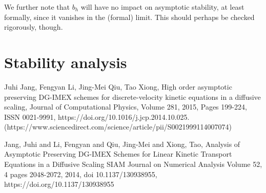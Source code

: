 \documentclass[]{article}
\begin{document}
We further note that $b_h$ will have no impact on asymptotic stability, at least formally, since it vanishes in the (formal) limit. This should perhaps be checked rigorously, though.

\section*{Stability analysis}

\begin{thebibliography}{9}
	Juhi Jang, Fengyan Li, Jing-Mei Qiu, Tao Xiong,
	High order asymptotic preserving DG-IMEX schemes for discrete-velocity kinetic equations in a diffusive scaling,
	Journal of Computational Physics,
	Volume 281,
	2015,
	Pages 199-224,
	ISSN 0021-9991,
	https://doi.org/10.1016/j.jcp.2014.10.025.
	(https://www.sciencedirect.com/science/article/pii/S0021999114007074)
	
		Jang, Juhi and Li, Fengyan and Qiu, Jing-Mei and Xiong, Tao,
		Analysis of Asymptotic Preserving DG-IMEX Schemes for Linear Kinetic Transport Equations in a Diffusive Scaling
		SIAM Journal on Numerical Analysis
		Volume 52, 4
		pages 2048-2072,
		2014,
		doi 10.1137/130938955,
			https://doi.org/10.1137/130938955


\end{thebibliography}
\end{document}
